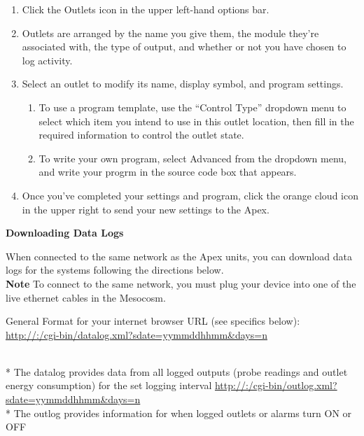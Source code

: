 \documentclass[
]{book}
\providecommand{\tightlist}{%
  \setlength{\itemsep}{0pt}\setlength{\parskip}{0pt}}
\begin{document}
\begin{enumerate}
\def\labelenumi{\arabic{enumi}.}
\tightlist
\item
  Click the Outlets icon in the upper left-hand options bar.
\item
  Outlets are arranged by the name you give them, the module they're associated with, the type of output, and whether or not you have chosen to log activity.
\item
  Select an outlet to modify its name, display symbol, and program settings.

  \begin{enumerate}
  \def\labelenumii{\arabic{enumii}.}
  \tightlist
  \item
    To use a program template, use the ``Control Type'' dropdown menu to select which item you intend to use in this outlet location, then fill in the required information to control the outlet state.
  \item
    To write your own program, select Advanced from the dropdown menu, and write your progrm in the source code box that appears.
  \end{enumerate}
\item
  Once you've completed your settings and program, click the orange cloud icon in the upper right to send your new settings to the Apex.
\end{enumerate}

\textbf{Downloading Data Logs}

When connected to the same network as the Apex units, you can download data logs for the systems following the directions below.\\
\textbf{Note} To connect to the same network, you must plug your device into one of the live ethernet cables in the Mesocosm.

General Format for your internet browser URL (see specifics below):\\
\url{http://:/cgi-bin/datalog.xml?sdate=yymmddhhmm\&days=n}\strut \\
* The datalog provides data from all logged outputs (probe readings and outlet energy consumption) for the set logging interval
\url{http://:/cgi-bin/outlog.xml?sdate=yymmddhhmm\&days=n}\\
* The outlog provides information for when logged outlets or alarms turn ON or OFF
\end{document}
